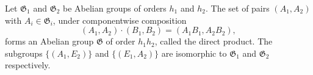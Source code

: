 Let $\mathfrak{G}_1$ and $\mathfrak{G}_2$ be Abelian groups of orders $h_1$ and $h_2$. The set of pairs $(A_1, A_2)$ with $A_i \in \mathfrak{G}_i$, under componentwise composition
$$(A_1, A_2) \cdot (B_1, B_2) = (A_1 B_1, A_2 B_2),$$
forms an Abelian group $\mathfrak{G}$ of order $h_1 h_2$, called the direct product. The subgroups $\{(A_1, E_2)\}$ and $\{(E_1, A_2)\}$ are isomorphic to $\mathfrak{G}_1$ and $\mathfrak{G}_2$ respectively.
